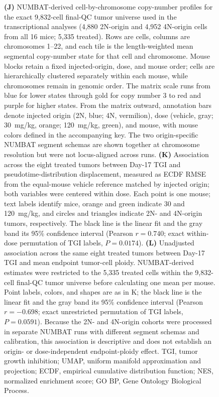 \documentclass[11pt,notitlepage]{article}
\begin{document}
\begin{figure}[p]
{\textbf{(J)} NUMBAT-derived cell-by-chromosome copy-number profiles for the exact 9,832-cell final-QC tumor universe used in the transcriptional analyses (4,880 2N-origin and 4,952 4N-origin cells from all 16 mice; 5,335 treated). Rows are cells, columns are chromosomes 1--22, and each tile is the length-weighted mean segmental copy-number state for that cell and chromosome. Mouse blocks retain a fixed injected-origin, dose, and mouse order; cells are hierarchically clustered separately within each mouse, while chromosomes remain in genomic order. The matrix scale runs from blue for lower states through gold for copy number 3 to red and purple for higher states. From the matrix outward, annotation bars denote injected origin (2N, blue; 4N, vermilion), dose (vehicle, gray; 30~mg/kg, orange; 120~mg/kg, green), and mouse, with mouse colors defined in the accompanying key. The two origin-specific NUMBAT segment schemas are shown together at chromosome resolution but were not locus-aligned across runs.
\textbf{(K)} Association across the eight treated tumors between Day-17 TGI and pseudotime-distribution displacement, measured as ECDF RMSE from the equal-mouse vehicle reference matched by injected origin; both variables were centered within dose. Each point is one mouse; text labels identify mice, orange and green indicate 30 and 120~mg/kg, and circles and triangles indicate 2N- and 4N-origin tumors, respectively. The black line is the linear fit and the gray band its 95\% confidence interval (Pearson \(r=0.740\); exact within-dose permutation of TGI labels, \(P=0.0174\)).
\textbf{(L)} Unadjusted association across the same eight treated tumors between Day-17 TGI and mean endpoint tumor-cell ploidy. NUMBAT-derived estimates were restricted to the 5,335 treated cells within the 9,832-cell final-QC tumor universe before calculating one mean per mouse. Point labels, colors, and shapes are as in K; the black line is the linear fit and the gray band its 95\% confidence interval (Pearson \(r=-0.698\); exact unrestricted permutation of TGI labels, \(P=0.0591\)). Because the 2N- and 4N-origin cohorts were processed in separate NUMBAT runs with different segment schemas and calibration, this association is descriptive and does not establish an origin- or dose-independent endpoint-ploidy effect. TGI, tumor growth inhibition; UMAP, uniform manifold approximation and projection; ECDF, empirical cumulative distribution function; NES, normalized enrichment score; GO BP, Gene Ontology Biological Process.
}
\end{figure}
\endgroup
\clearpage
\end{document}
